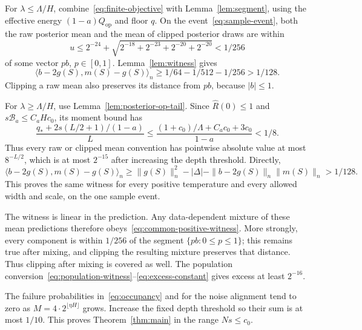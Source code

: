 For $\lambda\le\Lambda/H$, combine~\eqref{eq:finite-objective} with Lemma~\ref{lem:segment}, using the effective energy $(1-a)Q_{\mathrm{op}}$ and floor $q$. On the event~\eqref{eq:sample-event}, both the raw posterior mean and the mean of clipped posterior draws are within
\[
 u\le2^{-24}+\sqrt{2^{-18}+2^{-23}+2^{-20}+2^{-20}}<1/256
\]
of some vector $pb$, $p\in[0,1]$. Lemma~\ref{lem:witness} gives
\begin{equation}
 \langle b-2g(S),m(S)-g(S)\rangle_n
 \ge1/64-1/512-1/256>1/128.
 \label{eq:common-positive-witness}
\end{equation}
Clipping a raw mean also preserves its distance from $pb$, because $|b|\le1$.

For $\lambda\ge\Lambda/H$, use Lemma~\ref{lem:posterior-op-tail}. Since $\widehat R(0)\le1$ and $s\mathcal B_a\le C_aHc_0$, its moment bound has
\[
 \frac{q_*+2s(L/2+1)/(1-a)}L
 \le\frac{(1+c_0)/\Lambda+C_a c_0+3c_0}{1-a}<1/8.
\]
Thus every raw or clipped mean convention has pointwise absolute value at most $8^{-L/2}$, which is at most $2^{-15}$ after increasing the depth threshold. Directly,
\[
 \langle b-2g(S),m(S)-g(S)\rangle_n
 \ge\|g(S)\|_n^2-|\Delta|-\|b-2g(S)\|_n\|m(S)\|_n
 >1/128.
\]
This proves the same witness for every positive temperature and every allowed width and scale, on the one sample event.

The witness is linear in the prediction. Any data-dependent mixture of these mean predictions therefore obeys~\eqref{eq:common-positive-witness}. More strongly, every component is within $1/256$ of the segment $\{pb:0\le p\le1\}$; this remains true after mixing, and clipping the resulting mixture preserves that distance. Thus clipping after mixing is covered as well. The population conversion~\eqref{eq:population-witness}--\eqref{eq:excess-constant} gives excess at least $2^{-16}$.

The failure probabilities in~\eqref{eq:occupancy} and for the noise alignment tend to zero as $M=4\cdot2^{\lfloor\eta H\rfloor}$ grows. Increase the fixed depth threshold so their sum is at most $1/10$. This proves Theorem~\ref{thm:main} in the range $Ns\le c_0$.

